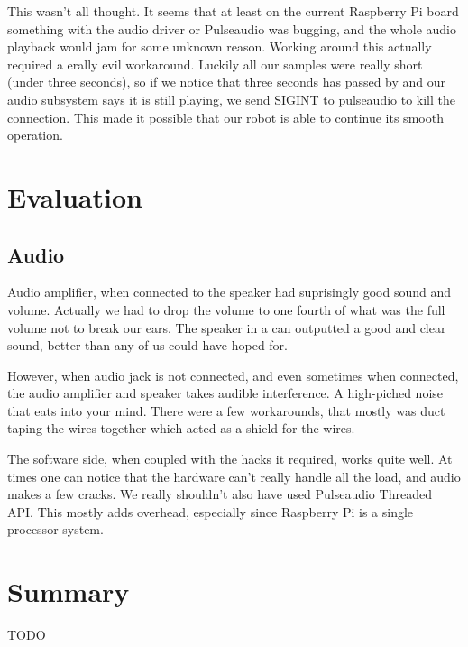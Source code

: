 \documentclass[english,11pt,twoside,a4paper]{article}
\begin{document}
This wasn't all thought. It seems that at least on the current Raspberry Pi board something with the audio driver or Pulseaudio was bugging, and the whole audio playback would jam for some unknown reason. Working around this actually required a erally evil workaround. Luckily all our samples were really short (under three seconds), so if we notice that three seconds has passed by and our audio subsystem says it is still playing, we send SIGINT to pulseaudio to kill the connection. This made it possible that our robot is able to continue its smooth operation.

\section{Evaluation}

\subsection{Audio}

Audio amplifier, when connected to the speaker had suprisingly good sound and volume. Actually we had to drop the volume to one fourth of what was the full volume not to break our ears. The speaker in a can outputted a good and clear sound, better than any of us could have hoped for.

However, when audio jack is not connected, and even sometimes when connected, the audio amplifier and speaker takes audible interference. A high-piched noise that eats into your mind. There were a few workarounds, that mostly was duct taping the wires together which acted as a shield for the wires.

The software side, when coupled with the hacks it required, works quite well. At times one can notice that the hardware can't really handle all the load, and audio makes a few cracks. We really shouldn't also have used Pulseaudio Threaded API. This mostly adds overhead, especially since Raspberry Pi is a single processor system.

\section{Summary}

TODO
\end{document}
